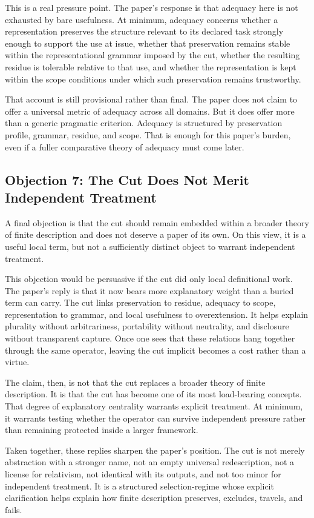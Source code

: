 \documentclass[11pt]{article}
\begin{document}
This is a real pressure point. The paper's response is that adequacy here is not exhausted by bare usefulness. At minimum, adequacy concerns whether a representation preserves the structure relevant to its declared task strongly enough to support the use at issue, whether that preservation remains stable within the representational grammar imposed by the cut, whether the resulting residue is tolerable relative to that use, and whether the representation is kept within the scope conditions under which such preservation remains trustworthy.

That account is still provisional rather than final. The paper does not claim to offer a universal metric of adequacy across all domains. But it does offer more than a generic pragmatic criterion. Adequacy is structured by preservation profile, grammar, residue, and scope. That is enough for this paper's burden, even if a fuller comparative theory of adequacy must come later.

\subsection{Objection 7: The Cut Does Not Merit Independent Treatment}

A final objection is that the cut should remain embedded within a broader theory of finite description and does not deserve a paper of its own. On this view, it is a useful local term, but not a sufficiently distinct object to warrant independent treatment.

This objection would be persuasive if the cut did only local definitional work. The paper's reply is that it now bears more explanatory weight than a buried term can carry. The cut links preservation to residue, adequacy to scope, representation to grammar, and local usefulness to overextension. It helps explain plurality without arbitrariness, portability without neutrality, and disclosure without transparent capture. Once one sees that these relations hang together through the same operator, leaving the cut implicit becomes a cost rather than a virtue.

The claim, then, is not that the cut replaces a broader theory of finite description. It is that the cut has become one of its most load-bearing concepts. That degree of explanatory centrality warrants explicit treatment. At minimum, it warrants testing whether the operator can survive independent pressure rather than remaining protected inside a larger framework.

Taken together, these replies sharpen the paper's position. The cut is not merely abstraction with a stronger name, not an empty universal redescription, not a license for relativism, not identical with its outputs, and not too minor for independent treatment. It is a structured selection-regime whose explicit clarification helps explain how finite description preserves, excludes, travels, and fails.
\end{document}

